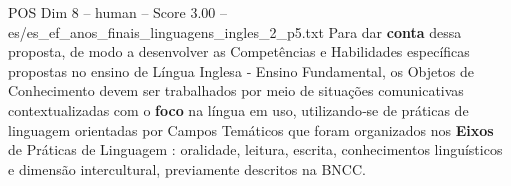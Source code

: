 \begin{textsample}{POS Dim 8 – human – Score 3.00 – es/es\_ef\_anos\_finais\_linguagens\_ingles\_2\_p5.txt}  \label{ex:f8_pos_002}
Para dar \textbf{conta} dessa proposta, de modo a desenvolver as Competências e Habilidades específicas propostas no ensino de Língua Inglesa ‐ Ensino Fundamental, os Objetos de Conhecimento devem ser trabalhados por meio de situações comunicativas contextualizadas com o \textbf{foco} na língua em uso, utilizando‐se de práticas de linguagem orientadas por Campos Temáticos que foram organizados nos \textbf{Eixos} de Práticas de Linguagem : oralidade, leitura, escrita, conhecimentos linguísticos e dimensão intercultural, previamente descritos na BNCC.

\end{textsample}

